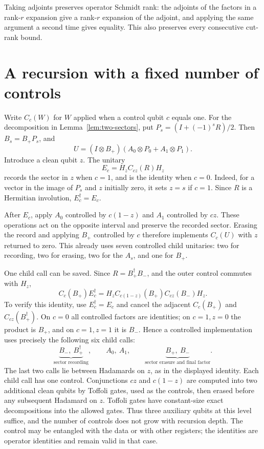 \documentclass[11pt]{article}
\begin{document}
Taking adjoints preserves operator Schmidt rank: the adjoints of the
factors in a rank-$r$ expansion give a rank-$r$ expansion of the adjoint,
and applying the same argument a second time gives equality. This also
preserves every consecutive cut-rank bound.

\section{A recursion with a fixed number of controls}

Write $C_c(W)$ for $W$ applied when a control qubit $c$ equals one.
For the decomposition in Lemma~\ref{lem:two-sectors}, put
$P_s=(I+(-1)^sR)/2$. Then $B_s=B_+P_s$, and
\[
 U=(I\otimes B_+)(A_0\otimes P_0+A_1\otimes P_1).
\]
Introduce a clean qubit $z$. The unitary
\[
 E_c=H_z C_{cz}(R)H_z
\]
records the sector in $z$ when $c=1$, and is the identity when $c=0$.
Indeed, for a vector in the image of $P_s$ and $z$ initially zero,
it sets $z=s$ if $c=1$. Since $R$ is a Hermitian involution,
$E_c^\dagger=E_c$.

After $E_c$, apply $A_0$ controlled by $c(1-z)$ and $A_1$ controlled
by $cz$. These operations act on the opposite interval and preserve
the recorded sector. Erasing the record and applying $B_+$ controlled
by $c$ therefore implements $C_c(U)$ with $z$ returned to zero.
This already uses seven controlled child unitaries: two for recording,
two for erasing, two for the $A_s$, and one for $B_+$.

One child call can be saved. Since $R=B_+^\dagger B_-$, and the
outer control commutes with $H_z$,
\[
 C_c(B_+)E_c^\dagger
   =H_z C_{c(1-z)}(B_+)C_{cz}(B_-)H_z.
\]
To verify this identity, use $E_c^\dagger=E_c$ and cancel the adjacent
$C_c(B_+)$ and $C_{cz}(B_+^\dagger)$. On $c=0$ all controlled factors
are identities; on $c=1,z=0$ the product is $B_+$, and on $c=1,z=1$
it is $B_-$. Hence a controlled implementation uses precisely the
following six child calls:
\[
 \underbrace{B_-,\ B_+^\dagger}_{\text{sector recording}},
 \qquad A_0,\ A_1,
 \qquad
 \underbrace{B_+,\ B_-}_{\text{sector erasure and final factor}}.
\]
The last two calls lie between Hadamards on $z$, as in the displayed
identity. Each child call has one control. Conjunctions $cz$ and
$c(1-z)$ are computed into two additional clean qubits by Toffoli
gates, used as the controls, then erased before any subsequent
Hadamard on $z$. Toffoli gates have constant-size exact decompositions
into the allowed gates. Thus three auxiliary qubits at this level
suffice, and the number of controls does not grow with recursion depth.
The control may be entangled with the data or with other registers;
the identities are operator identities and remain valid in that case.
\end{document}
